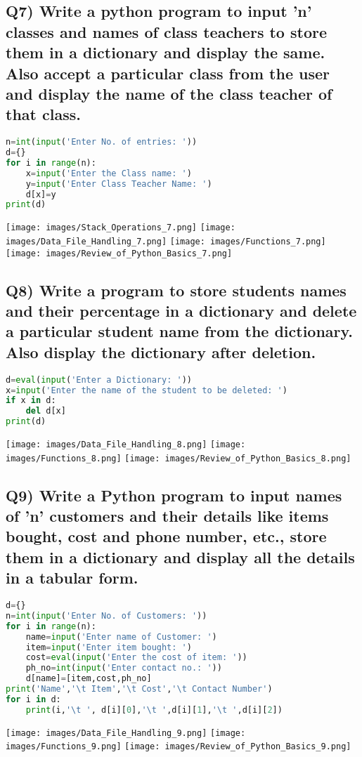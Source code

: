 \documentclass{article}
\begin{document}
\subsection*{Q7) Write a python program to input 'n' classes and names of class teachers to store them in a dictionary and display the same. Also accept a particular class from the user and display the name of the class teacher of that class.}
\begin{lstlisting}[language=Python]
n=int(input('Enter No. of entries: '))
d={}
for i in range(n):
    x=input('Enter the Class name: ')
    y=input('Enter Class Teacher Name: ')
    d[x]=y
print(d)
\end{lstlisting}
\texttt{[image: images/Stack\_Operations\_7.png]}
\texttt{[image: images/Data\_File\_Handling\_7.png]}
\texttt{[image: images/Functions\_7.png]}
\texttt{[image: images/Review\_of\_Python\_Basics\_7.png]}

\subsection*{Q8) Write a program to store students names and their percentage in a dictionary and delete a particular student name from the dictionary. Also display the dictionary after deletion.}
\begin{lstlisting}[language=Python]
d=eval(input('Enter a Dictionary: '))
x=input('Enter the name of the student to be deleted: ')
if x in d:
    del d[x]
print(d)
\end{lstlisting}
\texttt{[image: images/Data\_File\_Handling\_8.png]}
\texttt{[image: images/Functions\_8.png]}
\texttt{[image: images/Review\_of\_Python\_Basics\_8.png]}

\subsection*{Q9) Write a Python program to input names of 'n' customers and their details like items bought, cost and phone number, etc., store them in a dictionary and display all the details in a tabular form.}
\begin{lstlisting}[language=Python]
d={}
n=int(input('Enter No. of Customers: '))
for i in range(n):
    name=input('Enter name of Customer: ')
    item=input('Enter item bought: ')
    cost=eval(input('Enter the cost of item: '))
    ph_no=int(input('Enter contact no.: '))
    d[name]=[item,cost,ph_no]
print('Name','\t Item','\t Cost','\t Contact Number')
for i in d:
    print(i,'\t ', d[i][0],'\t ',d[i][1],'\t ',d[i][2])
\end{lstlisting}
\texttt{[image: images/Data\_File\_Handling\_9.png]}
\texttt{[image: images/Functions\_9.png]}
\texttt{[image: images/Review\_of\_Python\_Basics\_9.png]}
\end{document}
